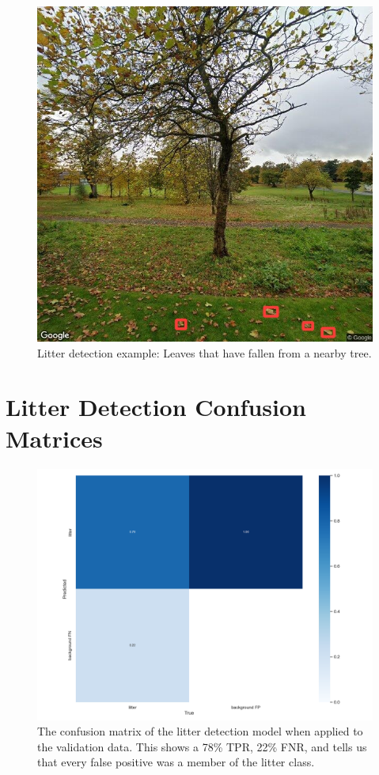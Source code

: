 \documentclass{thesis}
\begin{document}
\begin{appendices}
\begin{figure}[h]
    \centering
    \includegraphics[scale=0.45]{images/flaw-tree-leaves.jpg}
    \caption{Litter detection example: Leaves that have fallen from a nearby tree.}
\end{figure}

\chapter{Litter Detection Confusion Matrices}

\begin{figure}[h!]
    \centering
    \includegraphics[scale=0.5]{images/final-model-confusion-matrix-val.png}
    \caption{The confusion matrix of the litter detection model when applied to the validation data. This shows a 78\% TPR, 22\% FNR, and tells us that every false positive was a member of the litter class.}
    \label{fig:confusion-matrix-validation}
\end{figure}


\end{appendices}
\end{document}
